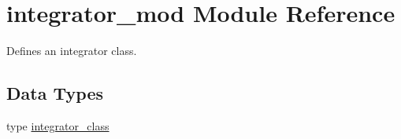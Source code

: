 \hypertarget{namespaceintegrator__mod}{}\section{integrator\+\_\+mod Module Reference}
\label{namespaceintegrator__mod}


Defines an integrator class.  


\subsection*{Data Types}
\begin{DoxyCompactItemize}
\item 
type \mbox{\hyperlink{structintegrator__mod_1_1integrator__class}{integrator\+\_\+class}}
\end{DoxyCompactItemize}
